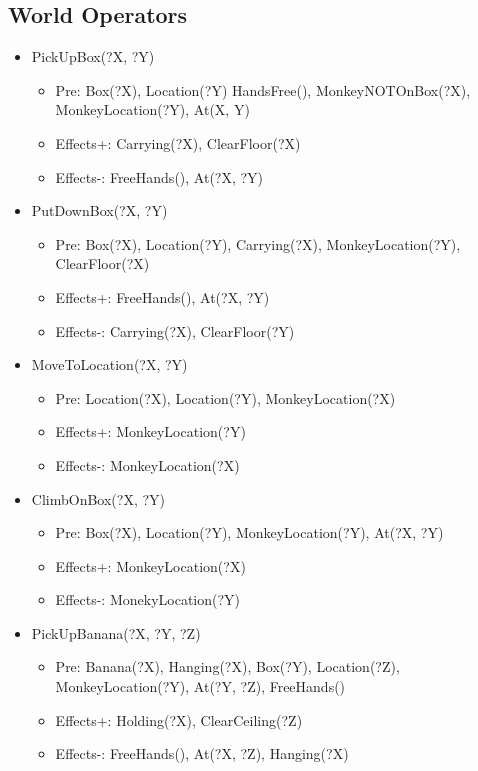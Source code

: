 \documentclass{article}
\begin{document}
\subsection*{World Operators}
\begin{itemize}
    \item PickUpBox(?X, ?Y)
        \begin{itemize}
            \item Pre: Box(?X), Location(?Y) HandsFree(), MonkeyNOTOnBox(?X), 
                MonkeyLocation(?Y), At(X, Y)
            \item Effects+: Carrying(?X), ClearFloor(?X)
            \item Effects-: FreeHands(), At(?X, ?Y)
        \end{itemize}
    \item PutDownBox(?X, ?Y)
        \begin{itemize}
            \item Pre: Box(?X), Location(?Y), Carrying(?X), MonkeyLocation(?Y),
                ClearFloor(?X)
            \item Effects+: FreeHands(), At(?X, ?Y)
            \item Effects-: Carrying(?X), ClearFloor(?Y)
        \end{itemize}
    \item MoveToLocation(?X, ?Y)
        \begin{itemize}
            \item Pre: Location(?X), Location(?Y), MonkeyLocation(?X)
            \item Effects+: MonkeyLocation(?Y)
            \item Effects-: MonkeyLocation(?X)
        \end{itemize}
    \item ClimbOnBox(?X, ?Y)
        \begin{itemize}
            \item Pre: Box(?X), Location(?Y), MonkeyLocation(?Y), At(?X, ?Y)
            \item Effects+: MonkeyLocation(?X)
            \item Effects-: MonekyLocation(?Y)
        \end{itemize}
    \item PickUpBanana(?X, ?Y, ?Z)
        \begin{itemize}
            \item Pre: Banana(?X), Hanging(?X),  Box(?Y), Location(?Z),
                MonkeyLocation(?Y), At(?Y, ?Z), FreeHands()
            \item Effects+: Holding(?X), ClearCeiling(?Z)
            \item Effects-: FreeHands(), At(?X, ?Z), Hanging(?X)
        \end{itemize}
\end{itemize}
\end{document}

